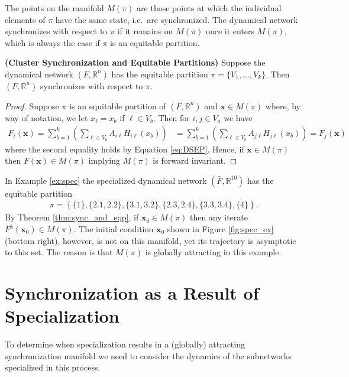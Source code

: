 \documentclass[12pt]{thesis}
\begin{document}
The points on the manifold $M(\pi)$ are those points at which the individual elements of $\pi$ have the same state, i.e.~are {synchronized}.
The dynamical network synchronizes with respect to $\pi$ if it remains on $M(\pi)$ once it enters $M(\pi)$, which is always the case if $\pi$ is an equitable partition.

\begin{theorem}\textbf{(Cluster Synchronization and Equitable Partitions)}\label{thm:sync_and_eqp}
Suppose the dynamical network $(F,\mathbb{R}^n)$ has the equitable partition $\pi=\{V_1,\dots,V_k\}$.
Then $(F,\mathbb{R}^n)$ synchronizes with respect to $\pi$.
\end{theorem}

\begin{proof}
Suppose $\pi$ is an equitable partition of $(F,\mathbb{R}^n)$ and $\mathbf{x}\in M(\pi)$ where, by way of notation, we let $x_\ell=x_b$ if $\ell\in V_b$.
Then for $i,j\in V_a$ we have 
\begin{align*}
    F_i(\mathbf{x})=\sum_{b=1}^k\left(\sum_{\ell\in V_b}A_{i\ell}H_{i\ell}(x_b)\right) &= \sum_{b=1}^k\left(\sum_{\ell\in V_b}A_{j\ell}H_{j\ell}(x_b)\right) = F_j(\mathbf{x})
\end{align*}
where the second equality holds by Equation \eqref{eq:DSEP}.
Hence, if $\mathbf{x}\in M(\pi)$ then $F(\mathbf{x})\in M(\pi)$ implying $M(\pi)$ is forward invariant.
\end{proof}

In Example \ref{ex:spec} the specialized dynamical network $(\bar{F},\mathbb{R}^{10})$ has the equitable partition
\begin{align*}
\pi = \left\{\{1\},\{2.1,2.2\},\{3.1,3.2\},\{2.3,2.4\},\{3.3,3.4\},\{4\}\right\}.
\end{align*}
By Theorem \ref{thm:sync_and_eqp}, if $\mathbf{x}_0\in M(\pi)$ then any iterate $F^k(\mathbf{x}_0)\in M(\pi)$.
The initial condition $\mathbf{x}_0$ shown in Figure \ref{fig:spec_ex} (bottom right), however, is not on this manifold, yet its trajectory is asymptotic to this set.
The reason is that $M(\pi)$ is globally attracting in this example.

\section{Synchronization as a Result of Specialization}

To determine when specialization results in a (globally) attracting synchronization manifold we need to consider the dynamics of the subnetworks specialized in this process.
\end{document}
